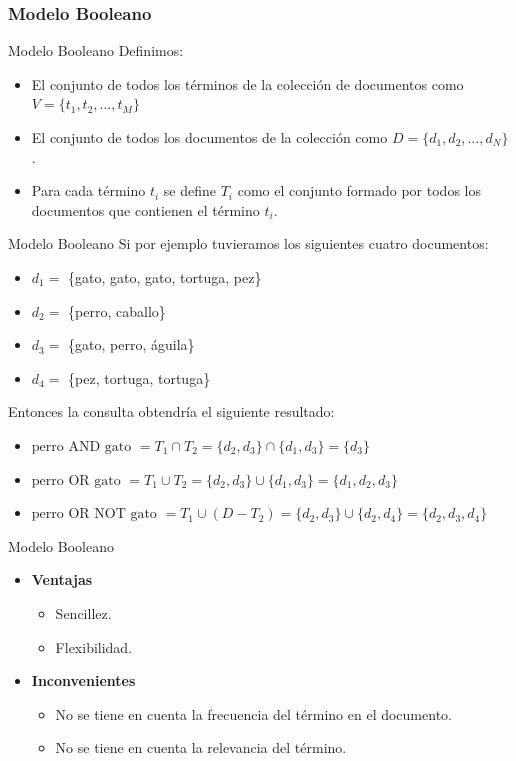 \documentclass[ignorenonframetext,aspectratio=43,]{beamer}
\begin{document}
\subsubsection{Modelo Booleano}
\begin{frame}{Modelo Booleano}
Definimos:
\begin{itemize}
\item El conjunto de todos los términos de la colección de documentos como $V = \{t_1, t_2, \dots, t_M\}$
\item El conjunto de todos los documentos de la colección como $D = \{d_1,d_2, \dots, d_N\}$.
\item Para cada término $t_i$ se define $T_i$ como el conjunto formado por todos los documentos que contienen el término $t_i$.
\end{itemize}
\end{frame}

\begin{frame}{Modelo Booleano}
Si por ejemplo tuvieramos los siguientes cuatro documentos:
\begin{itemize}
\item $d_1 = $ \{gato, gato, gato, tortuga, pez\}
\item $d_2 = $ \{perro, caballo\}
\item $d_3 = $ \{gato, perro, águila\}
\item $d_4 = $ \{pez, tortuga, tortuga\}
\end{itemize}
Entonces la consulta obtendría el siguiente resultado:
\begin{itemize}
\item $\textrm{perro AND gato } = T_1 \cap T_2 = \{d_2, d_3\} \cap \{d_1, d_3\} = \{d_3\}$
\item $\textrm{perro OR gato } = T_1 \cup T_2 = \{d_2, d_3\} \cup \{d_1, d_3\} = \{d_1, d_2, d_3\}$
\item $\textrm{perro OR NOT gato } = T_1 \cup (D - T_2) = \{d_2, d_3\} \cup \{d_2, d_4\} = \{d_2, d_3, d_4\}$
\end{itemize}
\end{frame}

\begin{frame}{Modelo Booleano}
\begin{itemize}
\item \textbf{Ventajas}
\begin{itemize}
\item Sencillez.
\item Flexibilidad.
\end{itemize}
\item \textbf{Inconvenientes}
\begin{itemize}
\item No se tiene en cuenta la frecuencia del término en el documento.
\item No se tiene en cuenta la relevancia del término.
\end{itemize}
\end{itemize}
\end{frame}
\end{document}
